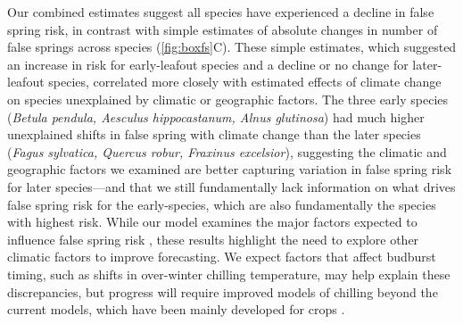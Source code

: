 \documentclass{article}\usepackage[]{graphicx}\usepackage[]{color}
\begin{document}
Our combined estimates suggest all species have experienced a decline in false spring risk, in contrast with simple estimates of absolute changes in number of false springs across species (\ref{fig:boxfs}C).  These simple estimates, which suggested an increase in risk for early-leafout species and a decline or no change for later-leafout species, correlated more closely with estimated effects of climate change on species unexplained by climatic or geographic factors. The three early species (\textit{Betula pendula, Aesculus hippocastanum, Alnus glutinosa}) had much higher unexplained shifts in false spring with climate change than the later species (\textit{Fagus sylvatica, Quercus robur, Fraxinus excelsior}), suggesting the climatic and geographic factors we examined are better capturing variation in false spring risk for later species---and that we still fundamentally lack information on what drives false spring risk for the early-species, which are also fundamentally the species with highest risk. While our model examines the major factors expected to influence false spring risk \citep{Liu2018,Ma2018,Vitasse2018,Wypych2016a}, these results highlight the need to explore other climatic factors to improve forecasting. We expect factors that affect budburst timing, such as shifts in over-winter chilling temperature, may help explain these discrepancies, but progress will require improved models of chilling beyond the current models, which have been mainly developed for crops \citep{Luedeling2011,Dennis2003}. 

\end{document}

